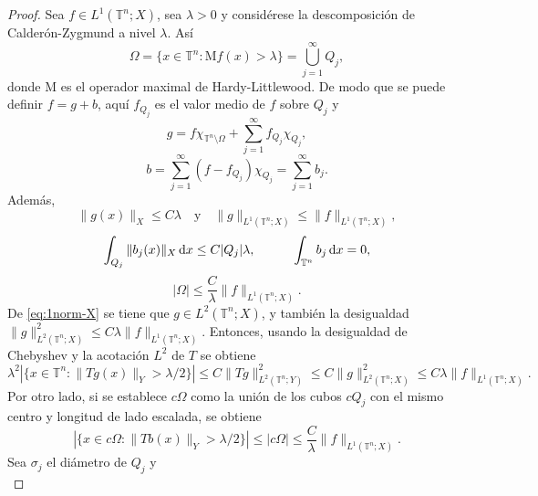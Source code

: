\begin{proof}
	Sea $f \in L^1(\mathbb{T}^n; X)$, sea $\lambda > 0$ y considérese la descomposición de Calderón-Zygmund a nivel $\lambda$. Así
	\begin{equation*}
		\Omega = \{x \in \mathbb{T}^n : \mathrm{M}f(x) > \lambda\} = \bigcup_{j=1}^\infty Q_j,
	\end{equation*}
	donde $\mathrm{M}$ es el operador maximal de Hardy-Littlewood. De modo que se puede definir $f = g + b$, aquí $f_{Q_j}$ es el valor medio de $f$ sobre $Q_j$ y
	\begin{equation*}
		g = f\chi_{\mathbb{T}^n \setminus \Omega} + \sum_{j=1}^\infty f_{Q_j}\chi_{Q_j},
	\end{equation*}
	\begin{equation*}
		b = \sum_{j=1}^\infty(f - f_{Q_j})\chi_{Q_j} = \sum_{j=1}^\infty b_j.
	\end{equation*}
	Además,
	\begin{equation}
		\|g(x)\|_X \leq C\lambda \quad \text{y} \quad \|g\|_{L^1(\mathbb{T}^n; X)} \leq \|f\|_{L^1(\mathbb{T}^n; X)},
		\label{eq:1norm-X}
	\end{equation}
	\begin{equation}
		\int_{Q_j} \|b_j(x)\|_X \mathop{}\!\mathrm{d} x \leq C|Q_j|\lambda, \quad  \quad \quad \int_{\mathbb{T}^n} b_j \mathop{}\!\mathrm{d} x = 0,
		\label{eq:cz-condition}
	\end{equation}
	\begin{equation*}
		|\Omega| \leq \frac{C}{\lambda}\|f\|_{L^1(\mathbb{T}^n; X)}.
	\end{equation*}
	De \cref{eq:1norm-X} se tiene que $g \in L^2(\mathbb{T}^n; X)$, y también la desigualdad $\|g\|_{L^2(\mathbb{T}^n; X)}^2 \leq C\lambda \|f\|_{L^1(\mathbb{T}^n; X)}$. Entonces, usando la desigualdad de Chebyshev y la acotación $L^2$ de $T$ se obtiene
	\begin{equation*}
		\lambda^2 |\{x \in \mathbb{T}^n : \|Tg(x)\|_Y > \lambda/2\}| \leq C\|Tg\|_{L^2(\mathbb{T}^n; Y)}^2 \leq C\|g\|_{L^2(\mathbb{T}^n; X)}^2 \leq C\lambda\|f\|_{L^1(\mathbb{T}^n; X)}.
	\end{equation*}
	Por otro lado, si se establece $c\Omega$ como la unión de los cubos $cQ_j$ con el mismo centro y longitud de lado escalada, se obtiene
	\begin{equation*}
		|\{ x \in c\Omega : \|Tb(x)\|_Y > \lambda/2  \}| \leq |c\Omega| \leq \frac{C}{\lambda}\|f\|_{L^1(\mathbb{T}^n; X)}.
	\end{equation*}
	Sea $\sigma_j$ el diámetro de $Q_j$ y
	\begin{equation*}

\end{equation*}
\end{proof}
